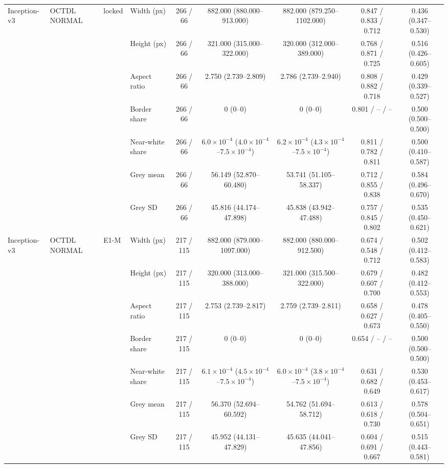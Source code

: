 \begin{longtable}{@{}llllccccc@{}}
\addlinespace[1pt]
Inception-v3 & OCTDL NORMAL & locked & Width (px) & 266 / 66 & 882.000 (880.000--913.000) & 882.000 (879.250--1102.000) & 0.847 / 0.833 / 0.712 & 0.436 (0.347--0.530) \\
 &  &  & Height (px) & 266 / 66 & 321.000 (315.000--322.000) & 320.000 (312.000--389.000) & 0.768 / 0.871 / 0.725 & 0.516 (0.426--0.605) \\
 &  &  & Aspect ratio & 266 / 66 & 2.750 (2.739--2.809) & 2.786 (2.739--2.940) & 0.808 / 0.882 / 0.718 & 0.429 (0.339--0.527) \\
 &  &  & Border share & 266 / 66 & 0 (0--0) & 0 (0--0) & 0.801 / -- / -- & 0.500 (0.500--0.500) \\
 &  &  & Near-white share & 266 / 66 & $6.0\times10^{-4}$ ($4.0\times10^{-4}$--$7.5\times10^{-4}$) & $6.2\times10^{-4}$ ($4.3\times10^{-4}$--$7.5\times10^{-4}$) & 0.811 / 0.782 / 0.811 & 0.500 (0.410--0.587) \\
 &  &  & Grey mean & 266 / 66 & 56.149 (52.870--60.480) & 53.741 (51.105--58.337) & 0.712 / 0.855 / 0.838 & 0.584 (0.496--0.670) \\
 &  &  & Grey SD & 266 / 66 & 45.816 (44.174--47.898) & 45.838 (43.942--47.488) & 0.757 / 0.845 / 0.802 & 0.535 (0.450--0.621) \\
\addlinespace[1pt]
Inception-v3 & OCTDL NORMAL & E1-M & Width (px) & 217 / 115 & 882.000 (879.000--1097.000) & 882.000 (880.000--912.500) & 0.674 / 0.548 / 0.712 & 0.502 (0.412--0.583) \\
 &  &  & Height (px) & 217 / 115 & 320.000 (313.000--388.000) & 321.000 (315.500--322.000) & 0.679 / 0.607 / 0.700 & 0.482 (0.412--0.553) \\
 &  &  & Aspect ratio & 217 / 115 & 2.753 (2.739--2.817) & 2.759 (2.739--2.811) & 0.658 / 0.627 / 0.673 & 0.478 (0.405--0.550) \\
 &  &  & Border share & 217 / 115 & 0 (0--0) & 0 (0--0) & 0.654 / -- / -- & 0.500 (0.500--0.500) \\
 &  &  & Near-white share & 217 / 115 & $6.1\times10^{-4}$ ($4.5\times10^{-4}$--$7.5\times10^{-4}$) & $6.0\times10^{-4}$ ($3.8\times10^{-4}$--$7.5\times10^{-4}$) & 0.631 / 0.682 / 0.649 & 0.530 (0.453--0.617) \\
 &  &  & Grey mean & 217 / 115 & 56.370 (52.694--60.592) & 54.762 (51.694--58.712) & 0.613 / 0.618 / 0.730 & 0.578 (0.504--0.651) \\
 &  &  & Grey SD & 217 / 115 & 45.952 (44.131--47.829) & 45.635 (44.041--47.856) & 0.604 / 0.691 / 0.667 & 0.515 (0.443--0.581) \\
\end{longtable}
